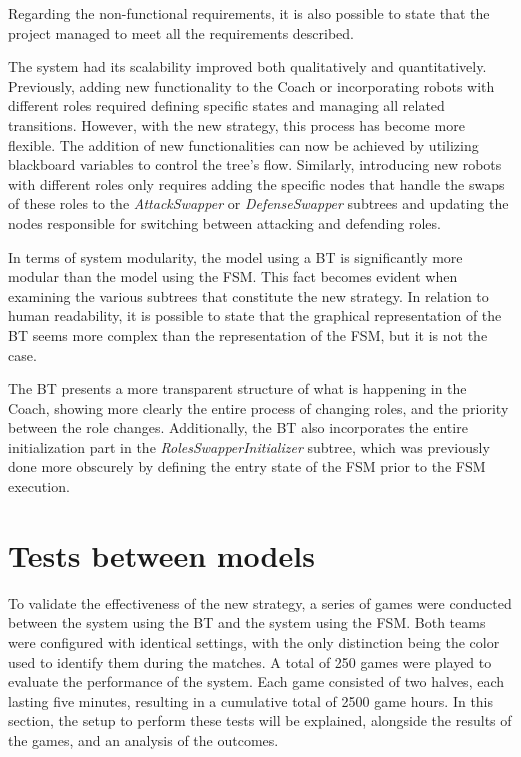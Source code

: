 Regarding the non-functional requirements, it is also possible to state that the project managed to meet all the requirements described.

The system had its scalability improved both qualitatively and quantitatively. Previously, adding new functionality to the Coach or incorporating robots with different roles required defining specific states and managing all related transitions. However, with the new strategy, this process has become more flexible. The addition of new functionalities can now be achieved by utilizing blackboard variables to control the tree's flow. Similarly, introducing new robots with different roles only requires adding the specific nodes that handle the swaps of these roles to the \textit{AttackSwapper} or \textit{DefenseSwapper} subtrees and updating the nodes responsible for switching between attacking and defending roles.

In terms of system modularity, the model using a BT is significantly more modular than the model using the FSM. This fact becomes evident when examining the various subtrees that constitute the new strategy. In relation to human readability, it is possible to state that the graphical representation of the BT seems more complex than the representation of the FSM, but it is not the case. 

The BT presents a more transparent structure of what is happening in the Coach, showing more clearly the entire process of changing roles, and the priority between the role changes. Additionally, the BT also incorporates the entire initialization part in the \textit{RolesSwapperInitializer} subtree, which was previously done more obscurely by defining the entry state of the FSM prior to the FSM execution.

\section{Tests between models}

To validate the effectiveness of the new strategy, a series of games were conducted between the system using the BT and the system using the FSM. Both teams were configured with identical settings, with the only distinction being the color used to identify them during the matches. A total of 250 games were played to evaluate the performance of the system. Each game consisted of two halves, each lasting five minutes, resulting in a cumulative total of 2500 game hours. In this section, the setup to perform these tests will be explained, alongside the results of the games, and an analysis of the outcomes.

